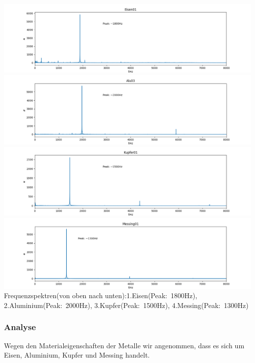 \documentclass[12pt,a4paper]{article}
\begin{document}
\includegraphics[width=\linewidth,height=\textheight,keepaspectratio]{Bilder/Eisen01_fourier.png}\\
\includegraphics[width=\linewidth,height=\textheight,keepaspectratio]{Bilder/Alu03_fourier.png}\\
\includegraphics[width=\linewidth,height=\textheight,keepaspectratio]{Bilder/Kupfer01_fourier.png}\\
\includegraphics[width=\linewidth,height=\textheight,keepaspectratio]{Bilder/Messing01_fourier.png}\\
Frequenzspektren(von oben nach unten):1.Eisen(Peak:~1800Hz), 2.Aluminium(Peak:~2000Hz), 3.Kupfer(Peak:~1500Hz), 4.Messing(Peak:~1300Hz)
\newpage
\subsubsection{Analyse}
Wegen den Materialeigenschaften der Metalle wir angenommen, dass es sich um Eisen, Aluminium, Kupfer und Messing handelt.
\end{document}
